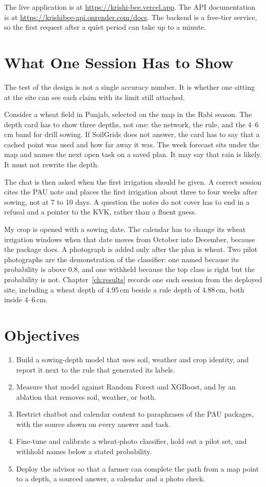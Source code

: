 The live application is at \url{https://krishi-bee.vercel.app}. The API documentation is at \url{https://krishibee-api.onrender.com/docs}. The backend is a free-tier service, so the first request after a quiet period can take up to a minute.

\section{What One Session Has to Show}
The test of the design is not a single accuracy number. It is whether one sitting at the site can see each claim with its limit still attached.

Consider a wheat field in Punjab, selected on the map in the Rabi season. The depth card has to show three depths, not one: the network, the rule, and the 4--6\,cm band for drill sowing. If SoilGrids does not answer, the card has to say that a cached point was used and how far away it was. The week forecast sits under the map and names the next open task on a saved plan. It may say that rain is likely. It must not rewrite the depth.

The chat is then asked when the first irrigation should be given. A correct session cites the PAU note and places the first irrigation about three to four weeks after sowing, not at 7 to 10 days. A question the notes do not cover has to end in a refusal and a pointer to the KVK, rather than a fluent guess.

My crop is opened with a sowing date. The calendar has to change its wheat irrigation windows when that date moves from October into December, because the package does. A photograph is added only after the plan is wheat. Two pilot photographs are the demonstration of the classifier: one named because its probability is above 0.8, and one withheld because the top class is right but the probability is not. Chapter~\ref{ch:results} records one such session from the deployed site, including a wheat depth of 4.95\,cm beside a rule depth of 4.88\,cm, both inside 4--6\,cm.

\section{Objectives}
\begin{enumerate}[leftmargin=1.4em]
    \item Build a sowing-depth model that uses soil, weather and crop identity, and report it next to the rule that generated its labels.
    \item Measure that model against Random Forest and XGBoost, and by an ablation that removes soil, weather, or both.
    \item Restrict chatbot and calendar content to paraphrases of the PAU packages, with the source shown on every answer and task.
    \item Fine-tune and calibrate a wheat-photo classifier, hold out a pilot set, and withhold names below a stated probability.
    \item Deploy the advisor so that a farmer can complete the path from a map point to a depth, a sourced answer, a calendar and a photo check.
\end{enumerate}

